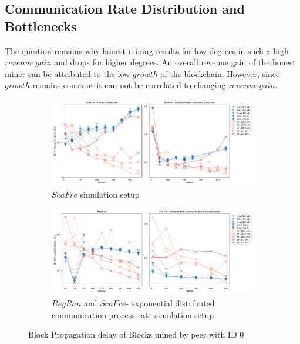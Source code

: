 \subsection{Communication Rate Distribution and Bottlenecks}
The question remains why honest mining results for low degrees in such a high $revenue~gain$ and drops for higher degrees. An overall revenue gain of the honest miner can be attributed to the low $growth$ of the blockchain. However, since $growth$ remains constant it can not be correlated to changing $revenue~gain$.
\begin{figure}[tbp]
	\begin{subfigure}[b]{\textwidth}
		\includegraphics[width=\textwidth]{figures/sm_edge_block_scafre.pdf}
		\caption{$ScaFre$ simulation setup}
		\label{fig:blockprop_bara}
	\end{subfigure}
	\begin{subfigure}[b]{\textwidth}
		\includegraphics[width=\textwidth]{figures/sm_edge_block_prop_rr_and_bc_dc.pdf}
		\caption{$RegRan$ and $ScaFre$- exponential distributed communication process rate simulation setup}
		\label{fig:blockprop_2}
	\end{subfigure}
\caption{Block Propagation delay of Blocks mined by peer with ID $0$}
\label{fig:blockprops}
\end{figure}\\
